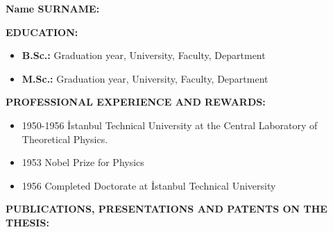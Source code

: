 


\textbf{Name SURNAME:} \\
\vspace{-6pt}
%

\textbf{EDUCATION:} 

\begin{itemize}
  \item \textbf{B.Sc.:} Graduation year, University, Faculty, Department
  \item \textbf{M.Sc.:} Graduation year, University, Faculty, Department
\end{itemize}

\textbf{PROFESSIONAL EXPERIENCE AND REWARDS:}   

\begin{itemize}
  \item 1950-1956 İstanbul Technical University at the Central Laboratory of Theoretical Physics.
  \item 1953 Nobel Prize for Physics
  \item 1956 Completed Doctorate at İstanbul Technical University
\end{itemize}

\textbf{PUBLICATIONS, PRESENTATIONS AND PATENTS ON THE THESIS:} 

